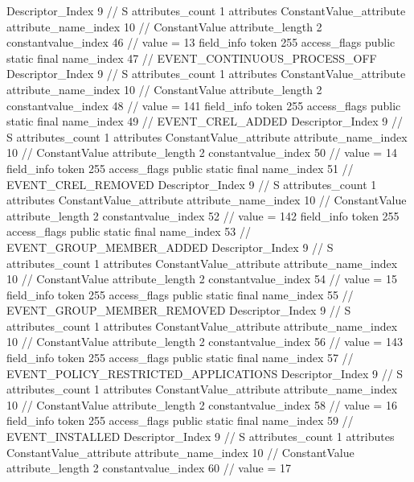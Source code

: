 {{{{{				Descriptor_Index	9		// S
				attributes_count	1
				attributes {
				ConstantValue_attribute {
					attribute_name_index	10		// ConstantValue
					attribute_length	2
					constantvalue_index	46		// value = 13
				}
				}
			}
			field_info {
				token	255
				access_flags	public static final
				name_index	47		// EVENT_CONTINUOUS_PROCESS_OFF
				Descriptor_Index	9		// S
				attributes_count	1
				attributes {
				ConstantValue_attribute {
					attribute_name_index	10		// ConstantValue
					attribute_length	2
					constantvalue_index	48		// value = 141
				}
				}
			}
			field_info {
				token	255
				access_flags	public static final
				name_index	49		// EVENT_CREL_ADDED
				Descriptor_Index	9		// S
				attributes_count	1
				attributes {
				ConstantValue_attribute {
					attribute_name_index	10		// ConstantValue
					attribute_length	2
					constantvalue_index	50		// value = 14
				}
				}
			}
			field_info {
				token	255
				access_flags	public static final
				name_index	51		// EVENT_CREL_REMOVED
				Descriptor_Index	9		// S
				attributes_count	1
				attributes {
				ConstantValue_attribute {
					attribute_name_index	10		// ConstantValue
					attribute_length	2
					constantvalue_index	52		// value = 142
				}
				}
			}
			field_info {
				token	255
				access_flags	public static final
				name_index	53		// EVENT_GROUP_MEMBER_ADDED
				Descriptor_Index	9		// S
				attributes_count	1
				attributes {
				ConstantValue_attribute {
					attribute_name_index	10		// ConstantValue
					attribute_length	2
					constantvalue_index	54		// value = 15
				}
				}
			}
			field_info {
				token	255
				access_flags	public static final
				name_index	55		// EVENT_GROUP_MEMBER_REMOVED
				Descriptor_Index	9		// S
				attributes_count	1
				attributes {
				ConstantValue_attribute {
					attribute_name_index	10		// ConstantValue
					attribute_length	2
					constantvalue_index	56		// value = 143
				}
				}
			}
			field_info {
				token	255
				access_flags	public static final
				name_index	57		// EVENT_POLICY_RESTRICTED_APPLICATIONS
				Descriptor_Index	9		// S
				attributes_count	1
				attributes {
				ConstantValue_attribute {
					attribute_name_index	10		// ConstantValue
					attribute_length	2
					constantvalue_index	58		// value = 16
				}
				}
			}
			field_info {
				token	255
				access_flags	public static final
				name_index	59		// EVENT_INSTALLED
				Descriptor_Index	9		// S
				attributes_count	1
				attributes {
				ConstantValue_attribute {
					attribute_name_index	10		// ConstantValue
					attribute_length	2
					constantvalue_index	60		// value = 17
}}}}}}}
